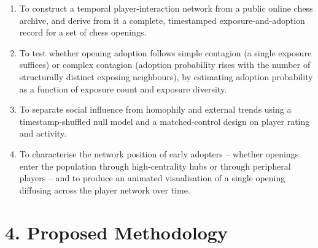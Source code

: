 \documentclass[11pt,a4paper]{article}
\begin{document}
\begin{enumerate}
    \item To construct a temporal player-interaction network from a public
    online chess archive, and derive from it a complete, timestamped
    exposure-and-adoption record for a set of chess openings.

    \item To test whether opening adoption follows simple contagion (a single
    exposure suffices) or complex contagion (adoption probability rises with the
    number of structurally distinct exposing neighbours), by estimating adoption
    probability as a function of exposure count and exposure diversity.

    \item To separate social influence from homophily and external trends using
    a timestamp-shuffled null model and a matched-control design on player
    rating and activity.

    \item To characterise the network position of early adopters -- whether
    openings enter the population through high-centrality hubs or through
    peripheral players -- and to produce an animated visualisation of a single
    opening diffusing across the player network over time.
\end{enumerate}

\section*{4. Proposed Methodology}
\end{document}
